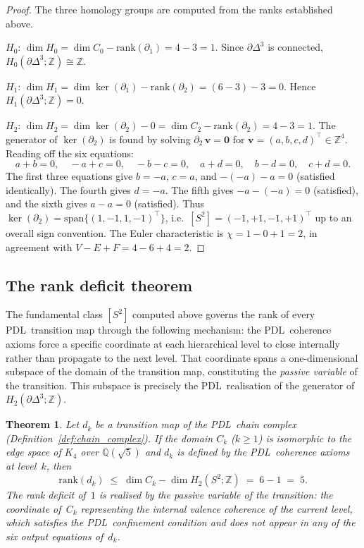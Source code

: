 \documentclass[11pt,a4paper]{article}
\newtheorem{theorem}{Theorem}[section]
\theoremstyle{definition}
\newcommand{\PDL}{\textnormal{PDL}}
\newcommand{\Kfour}{K_4}
\newcommand{\Sfour}{\partial\Delta^3}
\newcommand{\rank}{\mathrm{rank}}
\newcommand{\dmap}[1]{d_{#1}}
\begin{document}
\begin{proof}
The three homology groups are computed from the ranks established above.

\smallskip\noindent$H_0$: $\dim H_0 = \dim C_0 - \rank(\partial_1) = 4 - 3 = 1$. Since $\Sfour$ is connected, $H_0(\Sfour;\mathbb{Z}) \cong \mathbb{Z}$.

\smallskip\noindent$H_1$: $\dim H_1 = \dim\ker(\partial_1) - \rank(\partial_2) = (6 - 3) - 3 = 0$. Hence $H_1(\Sfour;\mathbb{Z}) = 0$.

\smallskip\noindent$H_2$: $\dim H_2 = \dim\ker(\partial_2) - 0 = \dim C_2 - \rank(\partial_2) = 4 - 3 = 1$. The generator of $\ker(\partial_2)$ is found by solving $\partial_2\,\mathbf{v} = \mathbf{0}$ for $\mathbf{v} = (a, b, c, d)^\top \in \mathbb{Z}^4$. Reading off the six equations:
\[
  a + b = 0,\quad -a + c = 0,\quad -b - c = 0,\quad a + d = 0,\quad b - d = 0,\quad c + d = 0.
\]
The first three equations give $b = -a$, $c = a$, and $-(-a) - a = 0$ (satisfied identically). The fourth gives $d = -a$. The fifth gives $-a - (-a) = 0$ (satisfied), and the sixth gives $a - a = 0$ (satisfied). Thus $\ker(\partial_2) = \mathrm{span}\{(1,-1,1,-1)^\top\}$, i.e.\ $[S^2] = (-1,+1,-1,+1)^\top$ up to an overall sign convention. The Euler characteristic is $\chi = 1 - 0 + 1 = 2$, in agreement with $V - E + F = 4 - 6 + 4 = 2$.
\end{proof}

\subsection{The rank deficit theorem}
\label{subsec:rank_deficit}

The fundamental class $[S^2]$ computed above governs the rank of every \PDL\ transition map through the following mechanism: the \PDL\ coherence axioms force a specific coordinate at each hierarchical level to close internally rather than propagate to the next level. That coordinate spans a one-dimensional subspace of the domain of the transition map, constituting the \emph{passive variable} of the transition. This subspace is precisely the \PDL\ realisation of the generator of $H_2(\Sfour;\mathbb{Z})$.

\begin{theorem}
  \label{thm:rank_deficit}
  Let $\dmap{k}$ be a transition map of the \PDL\ chain complex (Definition~\ref{def:chain_complex}). If the domain $C_k$ ($k \geq 1$) is isomorphic to the edge space of $\Kfour$ over $\mathbb{Q}(\sqrt{5})$ and $\dmap{k}$ is defined by the \PDL\ coherence axioms at level~$k$, then
  \[
    \rank(\dmap{k}) \;\leq\; \dim C_k - \dim H_2(S^2;\mathbb{Z}) \;=\; 6 - 1 \;=\; 5.
  \]
  The rank deficit of~$1$ is realised by the passive variable of the transition: the coordinate of~$C_k$ representing the internal valence coherence of the current level, which satisfies the \PDL\ confinement condition and does not appear in any of the six output equations of~$\dmap{k}$.
\end{theorem}
\end{document}
